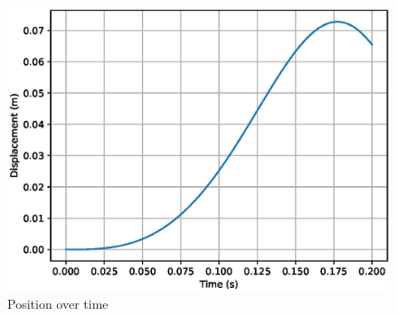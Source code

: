 \begin{figure}[H]
	\centering
	\captionsetup{justification=centering}
	\includegraphics[width=0.8\linewidth]{imgs/q4_x_t.eps}
	\caption{Position over time}%
	\label{fig:14}
\end{figure}
